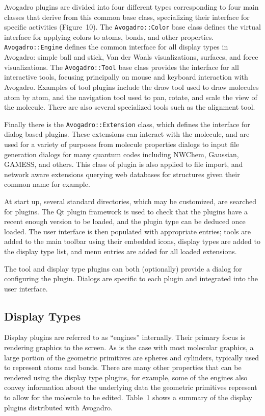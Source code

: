 \documentclass[10pt]{bmc_article}
\newenvironment{bmcformat}{\begin{raggedright}
  \baselineskip20pt\sloppy\setboolean{publ}{false}}{\end{raggedright}
  \baselineskip20pt\sloppy}
\begin{document}
\begin{bmcformat}
Avogadro plugins are divided into four different types corresponding
to four main classes
that derive from this common base class, specializing
their interface for specific activities
(Figure~10). The {\tt Avogadro::Color} base class
defines the virtual interface for applying colors to atoms, bonds, and other properties.
 {\tt Avogadro::Engine} defines the common interface for all display types in Avogadro:
simple ball and stick, Van der Waals visualizations,
surfaces, and force visualizations. The {\tt Avogadro::Tool} base class provides
the interface for all interactive tools, focusing principally on mouse and
keyboard interaction with Avogadro. Examples of tool plugins include the draw
tool used to draw molecules atom by atom, and the navigation tool used to pan,
rotate, and scale the view of the molecule. There are also several specialized
tools such as the alignment tool.

Finally there is the {\tt Avogadro::Extension} class, which defines the interface for
dialog based plugins. These extensions can interact with the molecule, and are
used for a variety of purposes from molecule properties dialogs to input file
generation dialogs for many quantum codes including NWChem, Gaussian, GAMESS, and
others. This class of plugin is also applied to file import, and network aware
extensions querying web databases for structures given their common name for
example.

At start up, several standard directories, which may be customized, are searched
for plugins. The Qt plugin framework is used to check that the plugins have a
recent enough version to be loaded, and the plugin type can be deduced once
loaded. The user interface is then populated with appropriate entries; tools are
added to the main toolbar using their embedded icons, display types are added to
the display type list, and menu entries are added for all loaded extensions.

The tool and display type plugins can both (optionally) provide a
dialog for configuring the plugin. Dialogs are specific to each plugin
and integrated into the user interface.

\subsection*{Display Types}

Display plugins are referred to as ``engines'' internally. Their
primary focus is rendering graphics to the screen. As is the case with most
molecular graphics, a large portion of the geometric primitives are spheres and
cylinders, typically used to represent atoms and bonds. There are many other
properties that can be rendered using the display type plugins, for example,
some of the engines also convey information about the underlying data the
geometric primitives represent to allow for the molecule to be edited. Table~1
shows a summary of the display plugins distributed with Avogadro.


\end{bmcformat}
\end{document}
